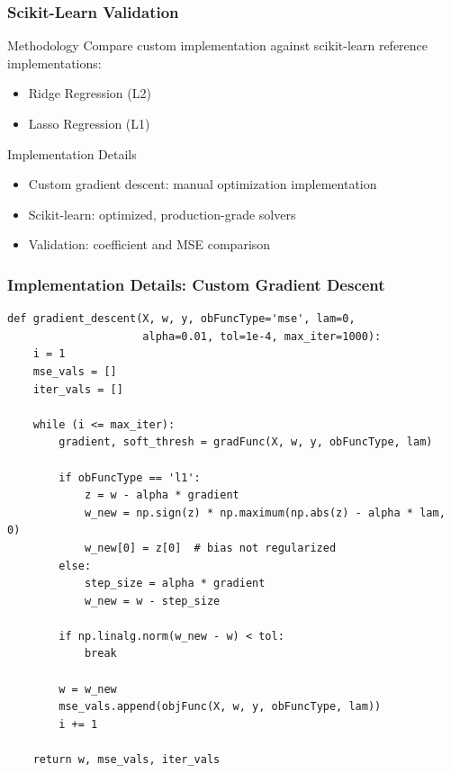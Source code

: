 \documentclass[11pt,aspectratio=169]{beamer}
\begin{document}
\begin{frame}
    \frametitle{Scikit-Learn Validation}
    \begin{block}{Methodology}
        Compare custom implementation against scikit-learn reference implementations:
        \begin{itemize}
            \item Ridge Regression (L2)
            \item Lasso Regression (L1)
        \end{itemize}
    \end{block}
    \vspace{0.5cm}
    \begin{block}{Implementation Details}
        \begin{itemize}
            \item Custom gradient descent: manual optimization implementation
            \item Scikit-learn: optimized, production-grade solvers
            \item Validation: coefficient and MSE comparison
        \end{itemize}
    \end{block}
\end{frame}

\begin{frame}
    \frametitle{Implementation Details: Custom Gradient Descent}
    \begin{lstlisting}[basicstyle=\ttfamily\tiny, keywordstyle=\color{blue}, commentstyle=\color{gray}]
def gradient_descent(X, w, y, obFuncType='mse', lam=0, 
                     alpha=0.01, tol=1e-4, max_iter=1000):
    i = 1
    mse_vals = []
    iter_vals = []
    
    while (i <= max_iter):
        gradient, soft_thresh = gradFunc(X, w, y, obFuncType, lam)
        
        if obFuncType == 'l1':
            z = w - alpha * gradient
            w_new = np.sign(z) * np.maximum(np.abs(z) - alpha * lam, 0)
            w_new[0] = z[0]  # bias not regularized
        else:
            step_size = alpha * gradient
            w_new = w - step_size
        
        if np.linalg.norm(w_new - w) < tol:
            break
        
        w = w_new
        mse_vals.append(objFunc(X, w, y, obFuncType, lam))
        i += 1
    
    return w, mse_vals, iter_vals
    \end{lstlisting}
\end{frame}
\end{document}
